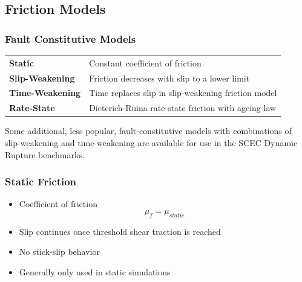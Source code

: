 \documentclass{beamer}
\begin{document}
\subsection{Friction Models}

\begin{frame}
  \frametitle{Fault Constitutive Models}

  \begin{tabular}{lp{3in}}
    {\bf\color{green} Static} & Constant coefficient of friction \\
    {\bf\color{green} Slip-Weakening} & Friction decreases with slip to a
    lower limit \\
    {\bf\color{green} Time-Weakening} & Time replaces slip in slip-weakening
    friction model \\
    {\bf\color{green} Rate-State} & Dieterich-Ruina rate-state friction with
    ageing law 
  \end{tabular}
  
  \vfill 
  Some additional, less popular, fault-constitutive models with
  combinations of slip-weakening and time-weakening are available for
  use in the SCEC Dynamic Rupture benchmarks. 
  \vfill

\end{frame}


\begin{frame}
  \frametitle{Static Friction}

  \begin{itemize}
  \item Coefficient of friction
    \begin{equation}
      \mu_f = \mu_\mathit{static}
    \end{equation}
  \item Slip continues once threshold shear traction is reached
  \item No stick-slip behavior
  \item Generally only used in static simulations
  \end{itemize}
  
\end{frame}
\end{document}
